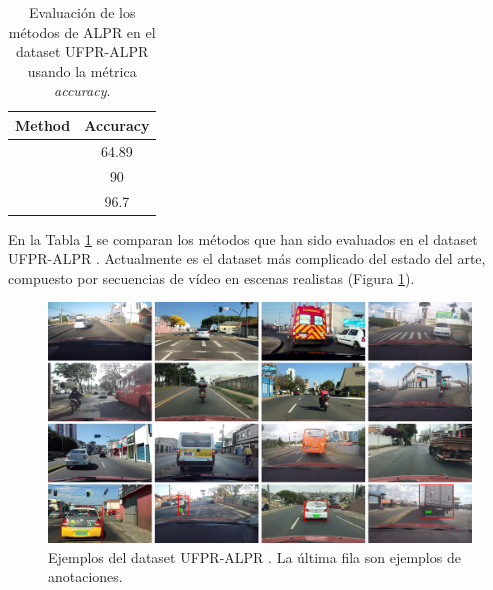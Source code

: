 \documentclass[a4paper, oneside, onecolumn, 11pt]{article}
\begin{document}
\begin{table}[h!]
\begin{center}
\begin{tabular}{l c}
\hline
Method & Accuracy \\
\hline
\cite{laroca2018robust} & 64.89 \\
\cite{laroca2021efficient} & 90 \\
\cite{Quang2022} & 96.7 \\
\hline
\end{tabular}
\end{center}
\caption{Evaluación de los métodos de ALPR en el dataset UFPR-ALPR \cite{laroca2018robust} usando la métrica \textit{accuracy}.}
\label{table:metodos_alpr}
\end{table}

En la Tabla \ref{table:metodos_alpr} se comparan los métodos que han sido evaluados en el dataset UFPR-ALPR \cite{laroca2018robust}. Actualmente es el dataset más complicado del estado del arte, compuesto por secuencias de vídeo en escenas realistas (Figura \ref{fig:ufpr}).

\begin{figure} [h]
    \begin{center}
      \includegraphics[width=\textwidth]{figs/ufpr.png}
    \end{center}
    \caption{Ejemplos del dataset UFPR-ALPR \cite{laroca2018robust}. La última fila son ejemplos de anotaciones.}
    \label{fig:ufpr}
\end{figure}

\clearpage
\thispagestyle{empty}
 
\end{document}
